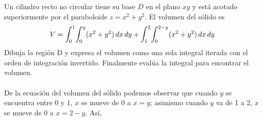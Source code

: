 \documentclass[12pt]{exam}
\begin{document}
\begin{questions}
\begin{enumerate}[a)]
\begin{align*}
    \end{align*}
    \begin{align*}
      &= 12 \cdot e^u \Big| _{-\ln{2}}^{0} \\
      &= 12 \left(e^{0}-e^{-\ln{2}}\right) \\
      &= 12\left(1-\frac{1}{e^{\ln{2}}}\right)\\
      &= 12\left(1-\frac{1}{2}\right)\\
      &= 12\left(\frac{1}{2}\right)\\
      &= 6
    \end{align*}
    $\therefore \mathlarger{\int}_{0}^{ln\,2}\mathlarger{\int}_{0}^{ln\,5}e^{2x-y}\,dx\,dy=6$
    \begin{figure}[H]
      \centering
      \texttt{[image: \{./img/t1a\_3b.png]}}
      \label{fig:3b}
      \caption{$e^{2x-y}$}
    \end{figure}
  \end{enumerate}
  \question 
  Un cilindro recto no circular tiene su base $D$ en el plano $xy$ y está acotado superiormente por el paraboloide $z=x^2+y^2$. El volumen del sólido es $$V=\mathlarger{\int}_0^1\mathlarger{\int}_0^{y}(x^2+y^2)\,dx\,dy + \mathlarger{\int}_1^2\mathlarger{\int}_0^{2-y}(x^2+y^2)\,dx\,dy$$ 
  Dibuja la región D y expresa el volumen como una sola integral iterada con el orden de integración invertido. Finalmente evalúa la integral para encontrar el volumen. \\ \\
  

  De la ecuación del volumen del sólido podemos observar que cuando $y$ se encuentra entre 0 y 1, $x$ se mueve de 0 a $x=y$; asimismo cuando $y$ va de 1 a 2, $x$ se mueve de 0 a $x=2-y$. Así,
  
  \begin{figure}[H]
    \centering
\end{figure}
\end{questions}
\end{document}
